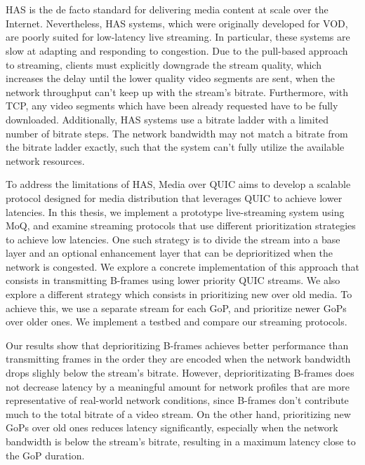 \chapter{\abstractname}

\ac{HAS} is the de facto standard for delivering media content at scale over the Internet. Nevertheless, \ac{HAS} systems, which were originally developed for \ac{VOD}, are poorly suited for low-latency live streaming. In particular, these systems are slow at adapting and responding to congestion. Due to the pull-based approach to streaming, clients must explicitly downgrade the stream quality, which increases the delay until the lower quality video segments are sent, when the network throughput can't keep up with the stream's bitrate. Furthermore, with TCP, any video segments which have been already requested have to be fully downloaded. Additionally, \ac{HAS} systems use a bitrate ladder with a limited number of bitrate steps. The network bandwidth may not match a bitrate from the bitrate ladder exactly, such that the system can't fully utilize the available network resources.

To address the limitations of \ac{HAS}, Media over QUIC aims to develop a scalable protocol designed for media distribution that leverages QUIC to achieve lower latencies. In this thesis, we implement a prototype live-streaming system using \ac{MoQ}, and examine streaming protocols that use different prioritization strategies to achieve low latencies. One such strategy is to divide the stream into a base layer and an optional enhancement layer that can be deprioritized when the network is congested. We explore a concrete implementation of this approach that consists in transmitting B-frames using lower priority QUIC streams. We also explore a different strategy which consists in prioritizing new over old media. To achieve this, we use a separate stream for each \ac{GoP}, and prioritize newer \acp{GoP} over older ones. We implement a testbed and compare our streaming protocols.

Our results show that deprioritizing B-frames achieves better performance than transmitting frames in the order they are encoded when the network bandwidth drops slighly below the stream's bitrate. However, deprioritizating B-frames does not decrease latency by a meaningful amount for network profiles that are more representative of real-world network conditions, since B-frames don't contribute much to the total bitrate of a video stream. On the other hand, prioritizing new \acp{GoP} over old ones reduces latency significantly, especially when the network bandwidth is below the stream's bitrate, resulting in a maximum latency close to the \ac{GoP} duration.